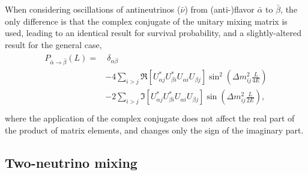When considering oscillations of antineutrinos ($\bar{\nu}$)
from (anti-)flavor $\bar{\alpha}$ to $\bar{\beta}$,
the only difference is that the complex conjugate
of the unitary mixing matrix is used,
leading to an identical result for survival probability,
and a slightly-altered result for the general case,
\begin{align}\label{eq:oscprob_general_anti}
    \begin{split}
        P_{\bar{\alpha}\to\bar{\beta}}(L) =
        &\ \delta_{\alpha\beta} \\
        & - 4\sum_{i>j} \Re \left[
            U^*_{\alpha j} U^*_{\beta i} U_{\alpha i} U_{\beta j}
        \right]
        \sin^2\left(\Delta m^2_{ij}\frac{L}{4E}\right) \\
        & - 2\sum_{i>j} \Im \left[
            U^*_{\alpha j} U^*_{\beta i} U_{\alpha i} U_{\beta j}
        \right]
        \sin\left(\Delta m^2_{ij}\frac{L}{2E}\right), \\
    \end{split}
\end{align}
where the application of the complex conjugate does not affect
the real part of the product of matrix elements,
and changes only the sign of the imaginary part.

\subsection{Two-neutrino mixing}
\label{subsec:two_nu_mixing}

